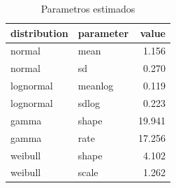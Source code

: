 \begin{table}

\caption{\label{tab:parametros_dist_g10}Parametros estimados}
\centering
\begin{tabular}[t]{llr}
\toprule
distribution & parameter & value\\
\midrule
normal & mean & 1.156\\
normal & sd & 0.270\\
lognormal & meanlog & 0.119\\
lognormal & sdlog & 0.223\\
gamma & shape & 19.941\\
\addlinespace
gamma & rate & 17.256\\
weibull & shape & 4.102\\
weibull & scale & 1.262\\
\bottomrule
\end{tabular}
\end{table}
